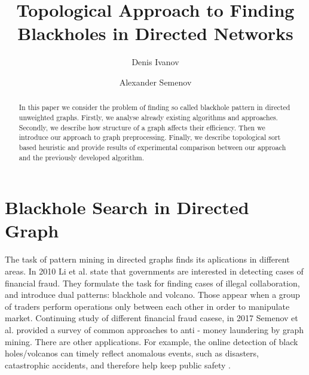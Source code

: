 \documentclass{svproc}
\begin{document}
\mainmatter              %
%
\title{Topological Approach to Finding Blackholes in Directed Networks}
%
%
\author{Denis Ivanov \and Alexander Semenov}
%
%
%

\maketitle              %

\begin{abstract}
In this paper we consider the problem of finding so called blackhole pattern in directed unweighted graphs.
Firstly, we analyse already existing algorithms and approaches. Secondly, we describe how structure of a graph
affects their efficiency. Then we introduce our approach to graph preprocessing. Finally, we describe topological sort based heuristic
and provide results of experimental comparison between our approach and the previously developed algorithm.
\end{abstract}

\section{Blackhole Search in Directed Graph}
The task of pattern mining in directed graphs finds its aplications in different areas. In 2010 Li et al.\cite{li2010detecting} state
that governments are interested in detecting cases of financial fraud. They formulate the task for finding cases of illegal collaboration, and introduce dual patterns:
blackhole and volcano. Those appear when a group of traders perform operations only between each other in order to manipulate market.
Continuing study of different financial fraud casese, in 2017 Semenov et al. \cite{semenov2017survey} provided a survey of common approaches to anti - money laundering by graph mining.
There are other applications. For example, the online detection of black holes/volcanos can timely 
reflect anomalous events, such as disasters, catastrophic accidents, and therefore help keep public safety \cite{hong2015detecting}.
\end{document}

